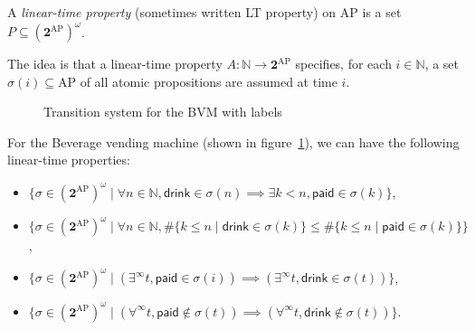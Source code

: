 \documentclass[./main]{subfiles}
\begin{document}
  \begin{defn}
    A \textit{linear-time property} (sometimes written LT property) on $\mathrm{AP}$ is a set $P \subseteq (\mathbf{2}^\mathrm{AP})^\omega$.
  \end{defn}
  
  The idea is that a linear-time property $A : \mathds{N} \to \mathbf{2}^\mathrm{AP}$ specifies, for each $i \in \mathds{N}$, a set $\sigma(i) \subseteq \mathrm{AP}$ of all atomic propositions are assumed at time $i$.

  \begin{figure}
    \centering
    \caption{Transition system for the BVM with labels}
    \label{fig:bvm-ts-label}
  \end{figure}

  \begin{exm}
    \label{exm:BVM-LTProp}
    For the Beverage vending machine (shown in figure~\ref{fig:bvm-ts-label}), we can have the following linear-time properties:
    \scriptsize
    \begin{itemize}
      \item $\{\sigma \in (\mathbf{2}^\mathrm{AP})^\omega \mid \forall n \in \mathds{N}, \mathsf{drink} \in \sigma(n) \implies\exists k < n, \mathsf{paid} \in \sigma(k) \}$,
      \item $\{\sigma \in (\mathbf{2}^\mathrm{AP})^\omega  \mid \forall n \in \mathds{N}, \#\{k \le n  \mid \mathsf{drink} \in \sigma(k)\} \le \# \{k \le n  \mid \mathsf{paid} \in \sigma(k)\} \} $,
      \item $\{\sigma \in (\mathbf{2}^\mathrm{AP})^\omega  \mid (\exists^\infty t, \mathsf{paid} \in \sigma(i)) \implies(\exists^\infty t, \mathsf{drink} \in \sigma(t)) \} $,
      \item $\{\sigma \in (\mathbf{2}^\mathrm{AP})^\omega \mid (\forall^\infty t, \mathsf{paid} \not\in \sigma(t)) \implies (\forall^\infty t, \mathsf{drink} \not\in \sigma(t)) \} $.
    \end{itemize}
  \end{exm}
\end{document}
